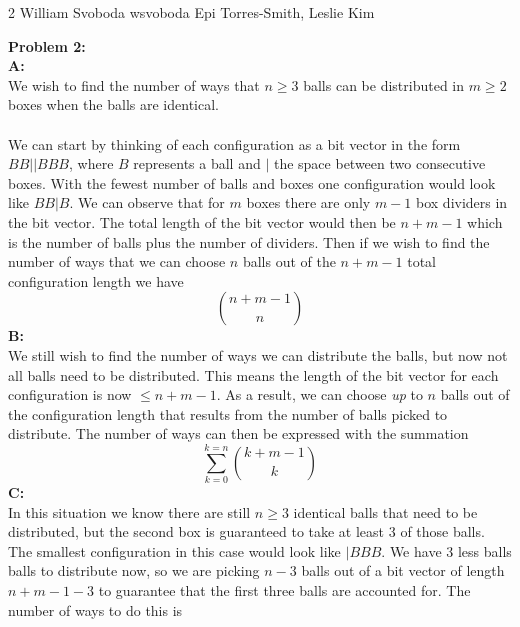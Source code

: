 \documentclass[12pt,letterpaper]{cos340hw}
\begin{document}
           {2}            %
           {William Svoboda}  %
           {wsvoboda}   %
           {Epi Torres-Smith, Leslie Kim} 




\noindent\textbf{Problem 2:}\\
\noindent\textbf{A:}\\
We wish to find the number of ways that $n\ge3$ balls can be distributed in $m\ge2$ boxes when the 
balls are identical.\\\\
We can start by thinking of each configuration as a bit vector in the form $BB||BBB$, where $B$ represents a 
ball and $|$ the space between two consecutive boxes. With the fewest number of balls and boxes one configuration 
would look like $BB|B$. We can observe that for $m$ boxes there are only $m-1$ box dividers in the bit vector. The 
total length of the bit vector would then be $n+m-1$ which is the number of balls plus the number of dividers. Then if 
we wish to find the number of ways that we can choose $n$ balls out of the $n+m-1$ total configuration length we have
$$\binom{n+m-1}{n}$$
\noindent\textbf{B:}\\
We still wish to find the number of ways we can distribute the balls, but now not all balls need to be distributed. This means
the length of the bit vector for each configuration is now $\le n+m-1$. As a result, we can choose \emph{up} to $n$ balls 
out of the configuration length that results from the number of balls picked to distribute. The number of ways can then be expressed
with the summation
$$\sum_{k=0}^{k=n}\binom{k+m-1}{k}$$
\noindent\textbf{C:}\\
In this situation we know there are still $n\ge3$ identical balls that need to be distributed, but the second box is guaranteed to take at least 3 of
those balls. The smallest configuration in this case would look like $|BBB$. We have 3 less balls balls to distribute now, so we are picking
$n-3$ balls out of a bit vector of length $n+m-1-3$ to guarantee that the first three balls are accounted for. The number of ways to do this is
\end{document}
